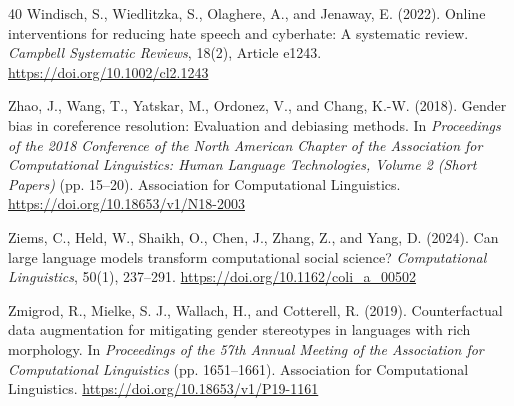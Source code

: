 \documentclass[a4paper,fleqn,review]{cas-sc}
\begin{document}
\begin{thebibliography}{40}
Windisch, S., Wiedlitzka, S., Olaghere, A., and Jenaway, E. (2022).
Online interventions for reducing hate speech and cyberhate: A systematic review.
\emph{Campbell Systematic Reviews}, 18(2), Article e1243.
\url{https://doi.org/10.1002/cl2.1243}

Zhao, J., Wang, T., Yatskar, M., Ordonez, V., and Chang, K.-W. (2018).
Gender bias in coreference resolution: Evaluation and debiasing methods.
In \emph{Proceedings of the 2018 Conference of the North American Chapter of the Association for Computational Linguistics: Human Language Technologies, Volume 2 (Short Papers)} (pp. 15--20).
Association for Computational Linguistics.
\url{https://doi.org/10.18653/v1/N18-2003}

Ziems, C., Held, W., Shaikh, O., Chen, J., Zhang, Z., and Yang, D. (2024).
Can large language models transform computational social science?
\emph{Computational Linguistics}, 50(1), 237--291.
\url{https://doi.org/10.1162/coli_a_00502}

Zmigrod, R., Mielke, S. J., Wallach, H., and Cotterell, R. (2019).
Counterfactual data augmentation for mitigating gender stereotypes in languages with rich morphology.
In \emph{Proceedings of the 57th Annual Meeting of the Association for Computational Linguistics} (pp. 1651--1661).
Association for Computational Linguistics.
\url{https://doi.org/10.18653/v1/P19-1161}

\end{thebibliography}
\end{document}
